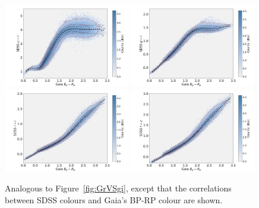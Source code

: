 \documentclass[fleqn,usenatbib]{mnras}
\begin{document}
\begin{figure}
 \centering\includegraphics[width=0.49\textwidth]{figures/ur-BR.png} 
 \centering\includegraphics[width=0.49\textwidth]{figures/gr-BR.png} 
 \centering\includegraphics[width=0.49\textwidth]{figures/ri-BR.png} 
 \centering\includegraphics[width=0.49\textwidth]{figures/rz-BR.png} 
\caption{Analogous to Figure~\ref{fig:GrVSgi}, except that the correlations between 
SDSS colours and Gaia's BP-RP colour are shown.}
\label{fig:VSBpRp}
\end{figure}
\end{document}
